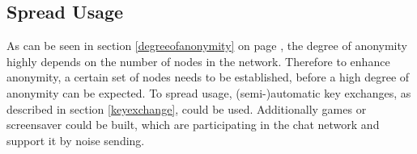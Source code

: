 \subsection{Spread Usage}
As can be seen in section \ref{degreeofanonymity} on page \pageref{degreeofanonymity},
the degree of anonymity highly depends on the number of nodes in the network.
Therefore to enhance anonymity, a certain set of nodes needs to be established,
before a high degree of anonymity can be expected.
To spread usage, (semi-)automatic key exchanges, as described
in section \ref{keyexchange}, could be used. Additionally 
games or screensaver could be built, which are participating in the
chat network and support it by noise sending.
